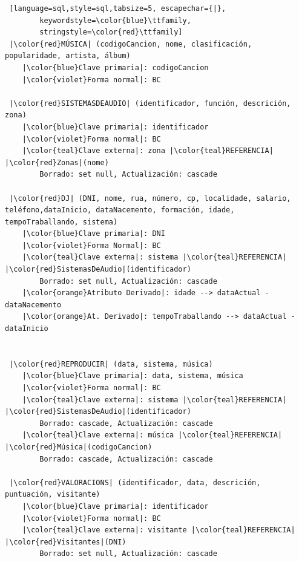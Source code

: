 \documentclass[12pt,a4paper]{book}
\theoremstyle{definition}
\theoremstyle{break}
\begin{document}
\begin{lstlisting} [language=sql,style=sql,tabsize=5, escapechar={|},
		keywordstyle=\color{blue}\ttfamily,
		stringstyle=\color{red}\ttfamily]
 |\color{red}MÚSICA| (codigoCancion, nome, clasificación, popularidade, artista, álbum)
	|\color{blue}Clave primaria|: codigoCancion
	|\color{violet}Forma normal|: BC
		
 |\color{red}SISTEMASDEAUDIO| (identificador, función, descrición, zona)
	|\color{blue}Clave primaria|: identificador
	|\color{violet}Forma normal|: BC
	|\color{teal}Clave externa|: zona |\color{teal}REFERENCIA| |\color{red}Zonas|(nome)
		Borrado: set null, Actualización: cascade
		
 |\color{red}DJ| (DNI, nome, rua, número, cp, localidade, salario, teléfono,dataInicio, dataNacemento, formación, idade, tempoTraballando, sistema)
	|\color{blue}Clave primaria|: DNI
	|\color{violet}Forma Normal|: BC
	|\color{teal}Clave externa|: sistema |\color{teal}REFERENCIA| |\color{red}SistemasDeAudio|(identificador)
		Borrado: set null, Actualización: cascade
	|\color{orange}Atributo Derivado|: idade --> dataActual - dataNacemento
	|\color{orange}At. Derivado|: tempoTraballando --> dataActual - dataInicio
		
		
 |\color{red}REPRODUCIR| (data, sistema, música)
	|\color{blue}Clave primaria|: data, sistema, música
	|\color{violet}Forma normal|: BC
	|\color{teal}Clave externa|: sistema |\color{teal}REFERENCIA| |\color{red}SistemasDeAudio|(identificador)
		Borrado: cascade, Actualización: cascade
	|\color{teal}Clave externa|: música |\color{teal}REFERENCIA| |\color{red}Música|(codigoCancion)
		Borrado: cascade, Actualización: cascade
		
 |\color{red}VALORACIONS| (identificador, data, descrición, puntuación, visitante)
	|\color{blue}Clave primaria|: identificador
	|\color{violet}Forma normal|: BC
	|\color{teal}Clave externa|: visitante |\color{teal}REFERENCIA| |\color{red}Visitantes|(DNI)
		Borrado: set null, Actualización: cascade

	\end{lstlisting}
\end{document}
